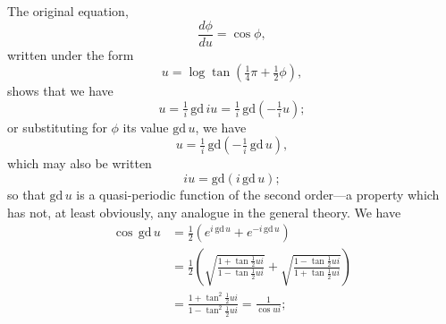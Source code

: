 \documentclass[11pt,a4paper]{article}
\theoremstyle{plain}
\begin{document}
The original equation,
\[
\frac{d\phi}{du} = \cos\phi,
\]
written under the form
\[
u = \log\tan\left(\tfrac{1}{4}\pi + \tfrac{1}{2}\phi\right),
\]
shows that we have
\[
u = \tfrac{1}{i}\,\mathrm{gd}\,iu = \tfrac{1}{i}\,\mathrm{gd}\left(-\tfrac{1}{i}u\right);
\]
or substituting for $\phi$ its value $\mathrm{gd}\,u$, we have
\[
u = \tfrac{1}{i}\,\mathrm{gd}\left(-\tfrac{1}{i}\,\mathrm{gd}\,u\right),
\]
which may also be written
\[
iu = \mathrm{gd}\left(i\,\mathrm{gd}\,u\right);
\]
so that $\mathrm{gd}\,u$ is a quasi-periodic function of the second order---a property which has not, at least obviously, any analogue in the general theory. We have
\begin{align*}
\cos\,\mathrm{gd}\,u &= \tfrac{1}{2}(e^{i\,\mathrm{gd}\,u} + e^{-i\,\mathrm{gd}\,u}) \\
&= \tfrac{1}{2}\left(\sqrt{\frac{1 + \tan\tfrac{1}{2}ui}{1 - \tan\tfrac{1}{2}ui}} + \sqrt{\frac{1 - \tan\tfrac{1}{2}ui}{1 + \tan\tfrac{1}{2}ui}}\right) \\
&= \frac{1 + \tan^2\tfrac{1}{2}ui}{1 - \tan^2\tfrac{1}{2}ui} = \frac{1}{\cos ui};
\end{align*}
\end{document}
